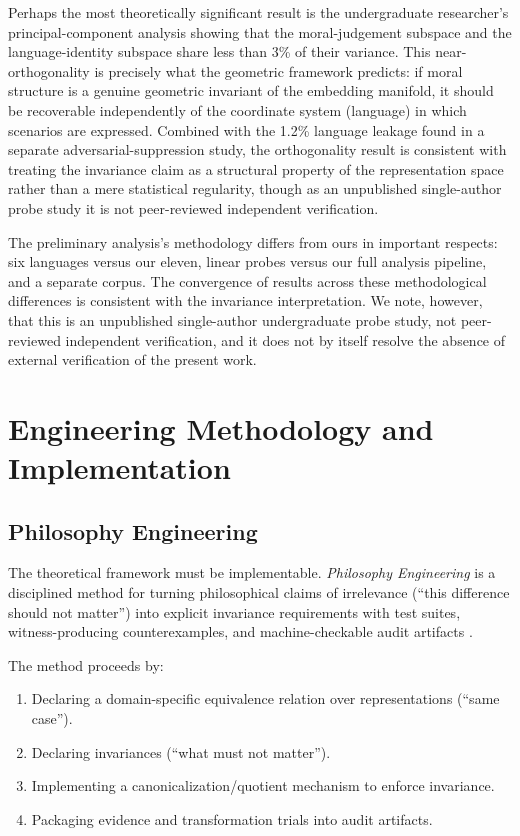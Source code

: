 \documentclass[12pt]{article}
\theoremstyle{definition}
\theoremstyle{remark}
\begin{document}
Perhaps the most theoretically significant result is the undergraduate researcher's principal-component analysis showing that the moral-judgement subspace and the language-identity subspace share less than 3\% of their variance. This near-orthogonality is precisely what the geometric framework predicts: if moral structure is a genuine geometric invariant of the embedding manifold, it should be recoverable independently of the coordinate system (language) in which scenarios are expressed. Combined with the 1.2\% language leakage found in a separate adversarial-suppression study, the orthogonality result is consistent with treating the invariance claim as a structural property of the representation space rather than a mere statistical regularity, though as an unpublished single-author probe study it is not peer-reviewed independent verification.

The preliminary analysis's methodology differs from ours in important respects: six languages versus our eleven, linear probes versus our full analysis pipeline, and a separate corpus. The convergence of results across these methodological differences is consistent with the invariance interpretation. We note, however, that this is an unpublished single-author undergraduate probe study, not peer-reviewed independent verification, and it does not by itself resolve the absence of external verification of the present work.


\section{Engineering Methodology and Implementation}
\label{sec:engineering}

\subsection{Philosophy Engineering}

The theoretical framework must be implementable. \emph{Philosophy Engineering} is a disciplined method for turning philosophical claims of irrelevance (``this difference should not matter'') into explicit invariance requirements with test suites, witness-producing counterexamples, and machine-checkable audit artifacts \citep{anon2025c}.

The method proceeds by:
\begin{enumerate}[label=(\roman*)]
    \item Declaring a domain-specific equivalence relation over representations (``same case'').
    \item Declaring invariances (``what must not matter'').
    \item Implementing a canonicalization/quotient mechanism to enforce invariance.
    \item Packaging evidence and transformation trials into audit artifacts.
\end{enumerate}
\end{document}
